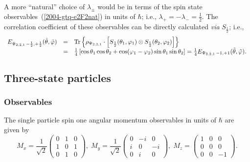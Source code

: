 \documentclass[fleqn,twoside]{article}      %
\begin{document}
A more ``natural'' choice of $\lambda_\pm$ would be in terms of the spin state observables~(\ref{2004-gtq-e2F2nat}) in units of $\hbar$;
i.e., $  \lambda_+ = -  \lambda_- =\frac{1}{2}$.
The correlation coefficient of  these observables can be directly calculated {\it via} $S_{\frac{1}{2}}$; i.e.,
\begin{equation}
\begin{array}{rcl}
E_{{ \Psi_{2,2,1}}\,-\frac{1}{2},+ \frac{1}{2} } ({\hat \theta},{\hat \varphi} )&=&
{\rm Tr}\left\{ \rho_{ \Psi_{2,2,1}} \cdot \left[ S_{\frac{1}{2}}(\theta_1,\varphi_1) \otimes S_{\frac{1}{2}}(\theta_2,\varphi_2)\right]\right\} \\
&=&
\frac{1}{4} \left[\cos
    \theta_1  \cos  \theta_2 +\cos ( \varphi_1 - \varphi_2 ) \sin \theta_1  \sin  \theta_2 \right]
= \frac{1}{4}E_{{ \Psi_{2,2,1}}\,-1 ,+1 } ({\hat \theta},{\hat \varphi} )
.
\label{2009-gtq-sso2}
\end{array}
\end{equation}



\subsection{Three-state particles}

\subsubsection*{Observables}
The single particle  spin one angular momentum observables in units of $\hbar$ are given by~\cite{schiff-55}
\begin{equation}
M_x=
\frac{1}{\sqrt{2}}
\left(
\begin{array}{cccccccccc}
0&1&0\\
1&0&1\\
0&1&0
\end{array}
\right),
\;
M_y=
\frac{1}{\sqrt{2}}
\left(
\begin{array}{cccccccccc}
0&-i&0\\
i&0&-i\\
0&i&0
\end{array}
\right),
\;
M_z=
\left(
\begin{array}{cccccccccc}
1&0&0\\
0&0&0\\
0&0&-1
\end{array}
\right).
\end{equation}
\end{document}
